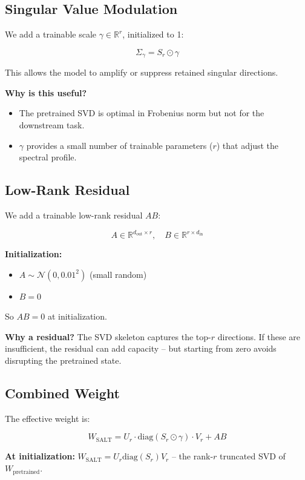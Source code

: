 \subsection{Singular Value Modulation}

We add a trainable scale $\gamma \in \mathbb{R}^r$, initialized to 1:

\[
\Sigma_\gamma = S_r \odot \gamma
\tag{4.3}
\]

This allows the model to amplify or suppress retained singular directions.

\textbf{Why is this useful?}
\begin{itemize}
\item The pretrained SVD is optimal in Frobenius norm but not for the downstream
  task.
\item $\gamma$ provides a small number of trainable parameters ($r$) that adjust
  the spectral profile.

\end{itemize}
\subsection{Low-Rank Residual}

We add a trainable low-rank residual $AB$:

\[
A \in \mathbb{R}^{d_\text{out} \times r}, \quad 
B \in \mathbb{R}^{r \times d_\text{in}}
\tag{4.4}
\]

\textbf{Initialization:}
\begin{itemize}
\item $A \sim \mathcal{N}(0, 0.01^2)$ (small random)
\item $B = 0$

\end{itemize}
So $AB = 0$ at initialization.

\textbf{Why a residual?} The SVD skeleton captures the top-$r$ directions. If 
these are insufficient, the residual can add capacity -- but starting from 
zero avoids disrupting the pretrained state.

\subsection{Combined Weight}

The effective weight is:

\[
W_\text{SALT} = U_r \cdot \text{diag}(S_r \odot \gamma) \cdot V_r + A B
\tag{4.5}
\]

\textbf{At initialization:} $W_\text{SALT} = U_r \text{diag}(S_r) V_r$ -- the 
rank-$r$ truncated SVD of $W_\text{pretrained}$.

